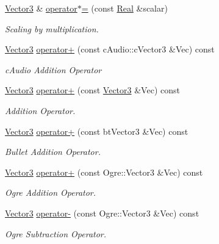\begin{DoxyCompactItemize}
\hyperlink{classphys_1_1Vector3}{Vector3} \& \hyperlink{classphys_1_1Vector3_a9dfb27e2ce041ce6141df76438960af0}{operator$\ast$=} (const \hyperlink{namespacephys_af7eb897198d265b8e868f45240230d5f}{Real} \&scalar)
\begin{DoxyCompactList}\small\item\em Scaling by multiplication. \item\end{DoxyCompactList}\item 
\hyperlink{classphys_1_1Vector3}{Vector3} \hyperlink{classphys_1_1Vector3_aef08d2451bb4959e02f1b09067284b5c}{operator+} (const cAudio::cVector3 \&Vec) const 
\begin{DoxyCompactList}\small\item\em cAudio Addition Operator \item\end{DoxyCompactList}\item 
\hyperlink{classphys_1_1Vector3}{Vector3} \hyperlink{classphys_1_1Vector3_a982248aea63e87a3163c3b591ab0a225}{operator+} (const \hyperlink{classphys_1_1Vector3}{Vector3} \&Vec) const 
\begin{DoxyCompactList}\small\item\em Addition Operator. \item\end{DoxyCompactList}\item 
\hyperlink{classphys_1_1Vector3}{Vector3} \hyperlink{classphys_1_1Vector3_a88fd674d6a8eaf2d256bdd10f7f8d05a}{operator+} (const btVector3 \&Vec) const 
\begin{DoxyCompactList}\small\item\em Bullet Addition Operator. \item\end{DoxyCompactList}\item 
\hyperlink{classphys_1_1Vector3}{Vector3} \hyperlink{classphys_1_1Vector3_a9d08649625ad4d5a7e8665c1234168b9}{operator+} (const Ogre::Vector3 \&Vec) const 
\begin{DoxyCompactList}\small\item\em Ogre Addition Operator. \item\end{DoxyCompactList}\item 
\hyperlink{classphys_1_1Vector3}{Vector3} \hyperlink{classphys_1_1Vector3_a1110bc38c3cb60f97c3946d13917401b}{operator-\/} (const Ogre::Vector3 \&Vec) const 
\begin{DoxyCompactList}\small\item\em Ogre Subtraction Operator. \item\end{DoxyCompactList}\item 

\end{DoxyCompactItemize}
